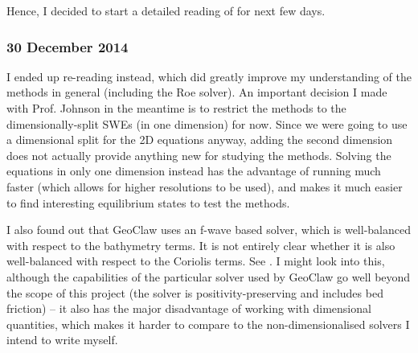 \documentclass[a4paper,onecolumn,11pt]{report}
\begin{document}
Hence, I decided to start a detailed reading of \citet{toro2001shock} for next few days.

\subsubsection*{30 December 2014}

I ended up re-reading \citet{leveque2002finite} instead, which did greatly improve my understanding of the methods in general (including the Roe solver). An important decision I made with Prof. Johnson in the meantime is to restrict the methods to the dimensionally-split SWEs (in one dimension) for now. Since we were going to use a dimensional split for the 2D equations anyway, adding the second dimension does not actually provide anything new for studying the methods. Solving the equations in only one dimension instead has the advantage of running much faster (which allows for higher resolutions to be used), and makes it much easier to find interesting equilibrium states to test the methods.

I also found out that GeoClaw uses an f-wave based solver, which is well-balanced with respect to the bathymetry terms. It is not entirely clear whether it is also well-balanced with respect to the Coriolis terms. See \citet{berger2011geoclaw}. I might look into this, although the capabilities of the particular solver used by GeoClaw go well beyond the scope of this project (the solver is positivity-preserving and includes bed friction) -- it also has the major disadvantage of working with dimensional quantities, which makes it harder to compare to the non-dimensionalised solvers I intend to write myself.



\end{document}
